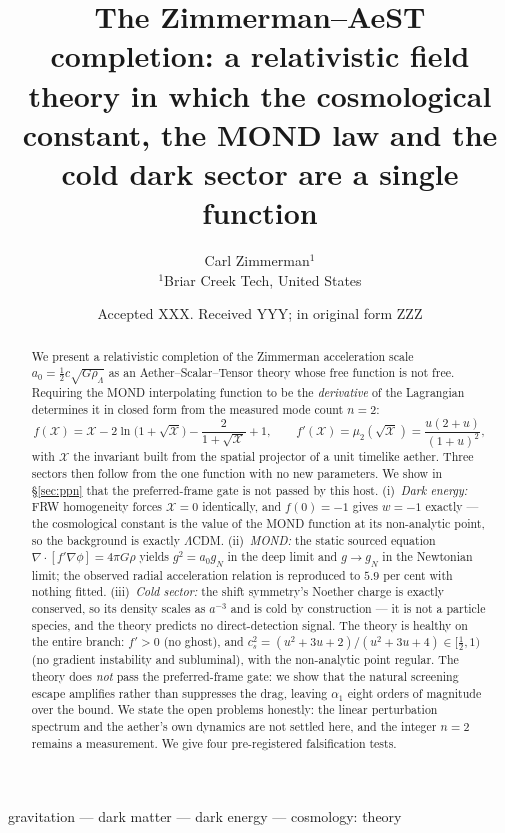 \documentclass[useAMS,usenatbib]{mnras}
\title[The Zimmerman--AeST completion: one function, three sectors]
{The Zimmerman--AeST completion: a relativistic field theory in which the
 cosmological constant, the MOND law and the cold dark sector are a single
 function}
\author[C. Zimmerman]{Carl Zimmerman$^{1}$\\
$^{1}$Briar Creek Tech, United States}
\date{Accepted XXX. Received YYY; in original form ZZZ}
\begin{document}
\label{firstpage}
\pagerange{\pageref{firstpage}--\pageref{lastpage}}
\maketitle

\begin{abstract}
We present a relativistic completion of the Zimmerman acceleration scale
$a_0 = \tfrac12 c\sqrt{G\rho_\Lambda}$ as an Aether--Scalar--Tensor theory
whose free function is not free.  Requiring the MOND interpolating function
to be the \emph{derivative} of the Lagrangian determines it in closed form
from the measured mode count $n=2$:
\[
f(\mathcal{X})=\mathcal{X}-2\ln\!\bigl(1+\sqrt{\mathcal{X}}\bigr)
-\frac{2}{1+\sqrt{\mathcal{X}}}+1,\qquad
f'(\mathcal{X})=\mu_2(\sqrt{\mathcal{X}})=\frac{u(2+u)}{(1+u)^2},
\]
with $\mathcal{X}$ the invariant built from the spatial projector of a unit
timelike aether.  Three sectors then follow from the one function with no new
parameters.  We show in \S\ref{sec:ppn} that the preferred-frame gate is not
passed by this host.  (i)~\emph{Dark energy:} FRW homogeneity forces
$\mathcal{X}=0$ identically, and $f(0)=-1$ gives $w=-1$ exactly --- the
cosmological constant is the value of the MOND function at its non-analytic
point, so the background is exactly $\Lambda$CDM.  (ii)~\emph{MOND:} the
static sourced equation $\nabla\!\cdot\![f'\nabla\phi]=4\pi G\rho$ yields
$g^2=a_0g_N$ in the deep limit and $g\to g_N$ in the Newtonian limit; the
observed radial acceleration relation is reproduced to $5.9$ per cent with
nothing fitted.  (iii)~\emph{Cold sector:} the shift symmetry's Noether
charge is exactly conserved, so its density scales as $a^{-3}$ and is cold by
construction --- it is not a particle species, and the theory predicts no
direct-detection signal.  The theory is healthy on the entire branch:
$f'>0$ (no ghost), and
$c_s^2=(u^2+3u+2)/(u^2+3u+4)\in[\tfrac12,1)$ (no gradient instability and
subluminal), with the non-analytic point regular.  The theory does
\emph{not} pass the preferred-frame gate: we show that the natural screening
escape amplifies rather than suppresses the drag, leaving $\alpha_1$ eight
orders of magnitude over the bound.  We state the open problems honestly: the
linear perturbation spectrum and the aether's own dynamics are not settled
here, and the integer $n=2$ remains a measurement.  We give four
pre-registered falsification tests.
\end{abstract}

\begin{keywords}
gravitation --- dark matter --- dark energy --- cosmology: theory
\end{keywords}
\end{document}
